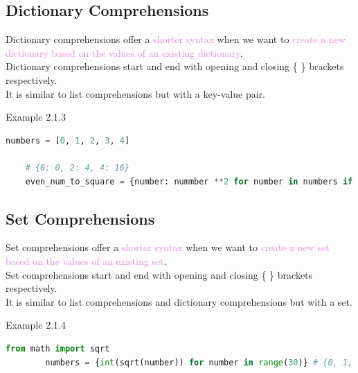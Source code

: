 \documentclass{book}
\begin{document}
    \subsection{Dictionary Comprehensions}
    Dictionary comprehensions offer a \textcolor{violet}{shorter syntax} when we want to \textcolor{violet}{create a new dictionary based on the values of an existing dictionary}. \\
    Dictionary comprehensions start and end with opening and closing \{ \} brackets respectively. \\
    It is similar to list comprehensions but with a key-value pair.
    \begin{egBox}[]{Example 2.1.3}{}
    \begin{lstlisting}[language=Python, basicstyle=\ttfamily\small, keywordstyle=\color{blue}, commentstyle=\color{forestgreen}, stringstyle=\color{red}, showstringspaces=false]
    numbers = [0, 1, 2, 3, 4]
    
    # {0: 0, 2: 4, 4: 16}
    even_num_to_square = {number: nummber **2 for number in numbers if number % 2 == 0} 
    \end{lstlisting}
    \end{egBox}
    \subsection{Set Comprehensions}
    Set comprehensions offer a \textcolor{violet}{shorter syntax} when we want to \textcolor{violet}{create a new set based on the values of an existing set}. \\
    Set comprehensions start and end with opening and closing \{ \} brackets respectively. \\
    It is similar to list comprehensions and dictionary comprehensions but with a set.
    \begin{egBox}[]{Example 2.1.4}{}
    \begin{lstlisting}[language=Python, basicstyle=\ttfamily\small, keywordstyle=\color{blue}, commentstyle=\color{forestgreen}, stringstyle=\color{red}, showstringspaces=false]
        from math import sqrt
        numbers = {int(sqrt(number)) for number in range(30)} # {0, 1, 2, 3, 4, 5}
    \end{lstlisting}
    \end{egBox}
\end{document}
